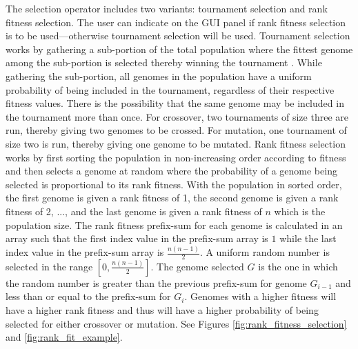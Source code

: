 The selection operator includes two variants: tournament selection and rank fitness selection. The user can indicate on the GUI panel if rank fitness selection is to be used---otherwise tournament selection will be used. Tournament selection works by gathering a sub-portion of the total population where the fittest genome among the sub-portion is selected thereby winning the tournament \cite{Miller95geneticalgorithms}. While gathering the sub-portion, all genomes in the population have a uniform probability of being included in the tournament, regardless of their respective fitness values. There is the possibility that the same genome may be included in the tournament more than once. For crossover, two tournaments of size three are run, thereby giving two genomes to be crossed. For mutation, one tournament of size two is run, thereby giving one genome to be mutated. Rank fitness selection works by first sorting the population in non-increasing order according to fitness and then selects a genome at random where the probability of a genome being selected is proportional to its rank fitness. With the population in sorted order, the first genome is given a rank fitness of 1, the second genome is given a rank fitness of 2, ..., and the last genome is given a rank fitness of $n$ which is the population size. The rank fitness prefix-sum for each genome is calculated in an array such that the first index value in the prefix-sum array is $1$ while the last index value in the prefix-sum array is $\frac{n(n-1)}{2}$. A uniform random number is selected in the range $\left[0,\frac{n(n-1)}{2}\right]$. The genome selected $G$ is the one in which the random number is greater than the previous prefix-sum for genome $G_{i-1}$ and less than or equal to the prefix-sum for $G_i$. Genomes with a higher fitness will have a higher rank fitness and thus will have a higher probability of being selected for either crossover or mutation. See Figures \ref{fig:rank_fitness_selection} and \ref{fig:rank_fit_example}. 

\renewcommand{\baselinestretch}{1.0}

